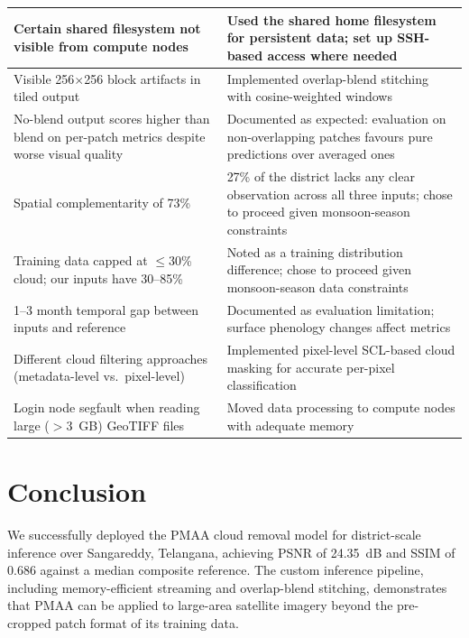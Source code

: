\documentclass[12pt,a4paper]{article}
\begin{document}
\begin{longtable}{p{}p{}}
\midrule
Certain shared filesystem not visible from compute nodes & Used the shared home filesystem for persistent data; set up SSH-based access where needed \\
\midrule
Visible 256$\times$256 block artifacts in tiled output & Implemented overlap-blend stitching with cosine-weighted windows \\
\midrule
No-blend output scores higher than blend on per-patch metrics despite worse visual quality & Documented as expected: evaluation on non-overlapping patches favours pure predictions over averaged ones \\
\midrule
Spatial complementarity of 73\% & 27\% of the district lacks any clear observation across all three inputs; chose to proceed given monsoon-season constraints \\
\midrule
Training data capped at $\leq$30\% cloud; our inputs have 30--85\% & Noted as a training distribution difference; chose to proceed given monsoon-season data constraints \\
\midrule
1--3 month temporal gap between inputs and reference & Documented as evaluation limitation; surface phenology changes affect metrics \\
\midrule
Different cloud filtering approaches (metadata-level vs.\ pixel-level) & Implemented pixel-level SCL-based cloud masking for accurate per-pixel classification \\
\midrule
Login node segfault when reading large ($>$3~GB) GeoTIFF files & Moved data processing to compute nodes with adequate memory \\

\end{longtable}



\section{Conclusion}

We successfully deployed the PMAA cloud removal model for district-scale inference over Sangareddy, Telangana, achieving PSNR of 24.35~dB and SSIM of 0.686 against a median composite reference. The custom inference pipeline, including memory-efficient streaming and overlap-blend stitching, demonstrates that PMAA can be applied to large-area satellite imagery beyond the pre-cropped patch format of its training data.
\end{document}
